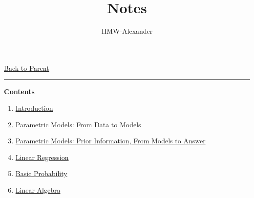 \documentclass[letterpaper,11pt]{article}
\title{\textbf{Notes}}
\author{HMW-Alexander}
\newcommand{\panhline}{\begin{center}\rule{\textwidth}{1pt}\end{center}}
\begin{document}
\maketitle
\href{../index.html}{Back to Parent}

\panhline
\textbf{Contents}

\begin{enumerate}
	\item \href{./01_Introduction/document.html}{Introduction}
	\item \href{./02_ParametricModels/document.html}{Parametric Models: From Data to Models}
	\item \href{./03_ParametricModels/document.html}{Parametric Models: Prior Information, From Models to Answer}
	\item \href{./04_LinearRegression}{Linear Regression}
	\item \href{./R1_BasicProbability/document.html}{Basic Probability}
	\item \href{./R2_LinearAlgebra/document.html}{Linear Algebra}
\end{enumerate}
\end{document}
